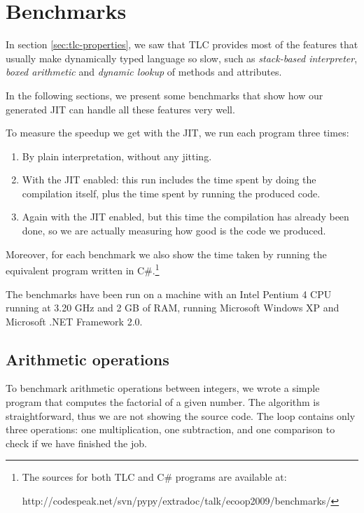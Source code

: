 \section{Benchmarks}
\label{sec:benchmarks}


In section \ref{sec:tlc-properties}, we saw that TLC provides most of the
features that usually make dynamically typed language so slow, such as
\emph{stack-based interpreter}, \emph{boxed arithmetic} and \emph{dynamic lookup} of
methods and attributes.

In the following sections, we present some benchmarks that show how our
generated JIT can handle all these features very well.

To measure the speedup we get with the JIT, we run each program three times:

\begin{enumerate}
\item By plain interpretation, without any jitting.
\item With the JIT enabled: this run includes the time spent by doing the
  compilation itself, plus the time spent by running the produced code.
\item Again with the JIT enabled, but this time the compilation has already
  been done, so we are actually measuring how good is the code we produced.
\end{enumerate}

Moreover, for each benchmark we also show the time taken by running the
equivalent program written in C\#.\footnote{The sources for both TLC and C\#
  programs are available at:

  http://codespeak.net/svn/pypy/extradoc/talk/ecoop2009/benchmarks/}

The benchmarks have been run on a machine with an Intel Pentium 4 CPU running at
3.20 GHz and 2 GB of RAM, running Microsoft Windows XP and Microsoft .NET
Framework 2.0.

\subsection{Arithmetic operations}

To benchmark arithmetic operations between integers, we wrote a simple program
that computes the factorial of a given number.  The algorithm is
straightforward, thus we are not showing the source code.  The loop contains only three operations: one
multiplication, one subtraction, and one comparison to check if we have
finished the job.

